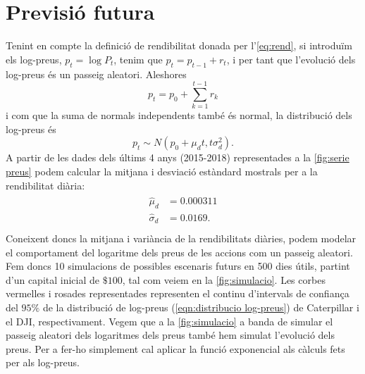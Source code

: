 \documentclass{article}
\numberwithin{table}{section}
\numberwithin{figure}{section}
\numberwithin{equation}{section}
\begin{document}
\section{Previsió futura}
Tenint en compte la definició de rendibilitat donada per l'\cref{eq:rend}, si introduïm els log-preus, \( p_t = \log{P_t} \), tenim que \( p_t = p_{t-1} + r_t \), i per tant que l'evolució dels log-preus és un passeig aleatori. Aleshores
\begin{equation} \label{eqn:passeig aleatori}
	p_t = p_0 + \sum_{k = 1}^{t-1}r_k 
\end{equation}
i com que la suma de normals independents també és normal, la distribució dels log-preus és
\begin{equation} \label{eqn:distribucio log-preus}
	p_t \sim N(p_0 + \mu_d t, t\sigma_d^2).
\end{equation}
A partir de les dades dels últims 4 anys (2015-2018) representades a la \cref{fig:serie preus} podem calcular la mitjana i desviació estàndard mostrals per a la rendibilitat diària:
\begin{align} \label{eq:parametres}
	\begin{split}
		\hat{\mu}_d &= 0.000311 \\
		\hat{\sigma}_d&	= 0.0169. \\
	\end{split}
\end{align}
Coneixent doncs la mitjana i variància de la rendibilitats diàries, podem modelar el comportament del logaritme dels preus de les accions com un passeig aleatori. Fem doncs 10 simulacions de
possibles escenaris futurs en 500 dies útils, partint d'un capital inicial de $\$100$, tal com veiem en la \cref{fig:simulacio}. Les corbes vermelles i rosades representades representen el continu d'intervals de confiança del $95\%$ de la distribució de log-preus (\cref{eqn:distribucio log-preus}) de Caterpillar i el DJI, respectivament. Vegem que a la \cref{fig:simulacio} a banda de simular el passeig aleatori dels logaritmes dels preus també hem simulat l'evolució dels preus. Per a fer-ho simplement cal aplicar la funció exponencial als càlculs fets per als log-preus.
\end{document}
